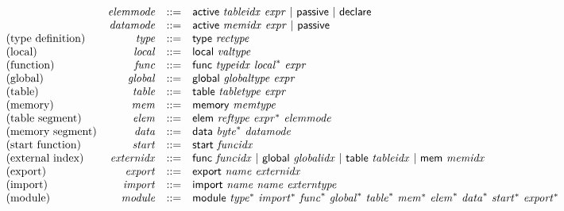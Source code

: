 $$
\begin{array}{@{}lrrl@{}l@{}}
& {\mathit{elemmode}} &::=& \mathsf{active}~{\mathit{tableidx}}~{\mathit{expr}} ~|~ \mathsf{passive} ~|~ \mathsf{declare} \\
& {\mathit{datamode}} &::=& \mathsf{active}~{\mathit{memidx}}~{\mathit{expr}} ~|~ \mathsf{passive} \\
\mbox{(type definition)} & {\mathit{type}} &::=& \mathsf{type}~{\mathit{rectype}} \\
\mbox{(local)} & {\mathit{local}} &::=& \mathsf{local}~{\mathit{valtype}} \\
\mbox{(function)} & {\mathit{func}} &::=& \mathsf{func}~{\mathit{typeidx}}~{{\mathit{local}}^\ast}~{\mathit{expr}} \\
\mbox{(global)} & {\mathit{global}} &::=& \mathsf{global}~{\mathit{globaltype}}~{\mathit{expr}} \\
\mbox{(table)} & {\mathit{table}} &::=& \mathsf{table}~{\mathit{tabletype}}~{\mathit{expr}} \\
\mbox{(memory)} & {\mathit{mem}} &::=& \mathsf{memory}~{\mathit{memtype}} \\
\mbox{(table segment)} & {\mathit{elem}} &::=& \mathsf{elem}~{\mathit{reftype}}~{{\mathit{expr}}^\ast}~{\mathit{elemmode}} \\
\mbox{(memory segment)} & {\mathit{data}} &::=& \mathsf{data}~{{\mathit{byte}}^\ast}~{\mathit{datamode}} \\
\mbox{(start function)} & {\mathit{start}} &::=& \mathsf{start}~{\mathit{funcidx}} \\
\mbox{(external index)} & {\mathit{externidx}} &::=& \mathsf{func}~{\mathit{funcidx}} ~|~ \mathsf{global}~{\mathit{globalidx}} ~|~ \mathsf{table}~{\mathit{tableidx}} ~|~ \mathsf{mem}~{\mathit{memidx}} \\
\mbox{(export)} & {\mathit{export}} &::=& \mathsf{export}~{\mathit{name}}~{\mathit{externidx}} \\
\mbox{(import)} & {\mathit{import}} &::=& \mathsf{import}~{\mathit{name}}~{\mathit{name}}~{\mathit{externtype}} \\
\mbox{(module)} & {\mathit{module}} &::=& \mathsf{module}~{{\mathit{type}}^\ast}~{{\mathit{import}}^\ast}~{{\mathit{func}}^\ast}~{{\mathit{global}}^\ast}~{{\mathit{table}}^\ast}~{{\mathit{mem}}^\ast}~{{\mathit{elem}}^\ast}~{{\mathit{data}}^\ast}~{{\mathit{start}}^\ast}~{{\mathit{export}}^\ast} \\
\end{array}
$$

\vspace{1ex}

